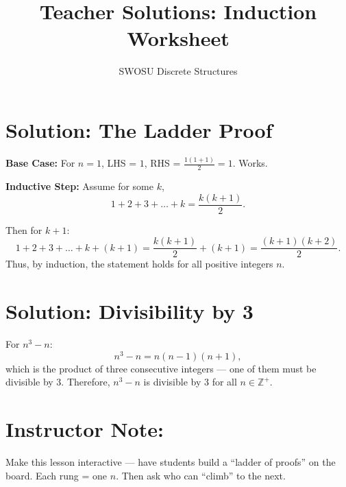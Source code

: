 \documentclass[12pt]{article}
\title{Teacher Solutions: Induction Worksheet}
\author{SWOSU Discrete Structures}
\date{}
\begin{document}
\maketitle

\section*{Solution: The Ladder Proof}

\noindent \textbf{Base Case:} For $n=1$, LHS = $1$, RHS = $\frac{1(1+1)}{2} = 1$. Works.

\noindent \textbf{Inductive Step:}  
Assume for some $k$,  
\[
1 + 2 + 3 + \dots + k = \frac{k(k+1)}{2}.
\]

\noindent Then for $k+1$:
\[
1 + 2 + 3 + \dots + k + (k+1) = \frac{k(k+1)}{2} + (k+1) = \frac{(k+1)(k+2)}{2}.
\]
Thus, by induction, the statement holds for all positive integers $n$.

\section*{Solution: Divisibility by 3}

For $n^3 - n$:
\[
n^3 - n = n(n-1)(n+1),
\]
which is the product of three consecutive integers — one of them must be divisible by 3.  
Therefore, $n^3 - n$ is divisible by 3 for all $n \in \mathbb{Z}^+$.

\section*{Instructor Note:}
Make this lesson interactive — have students build a “ladder of proofs” on the board.  
Each rung = one $n$. Then ask who can “climb” to the next.
\end{document}
